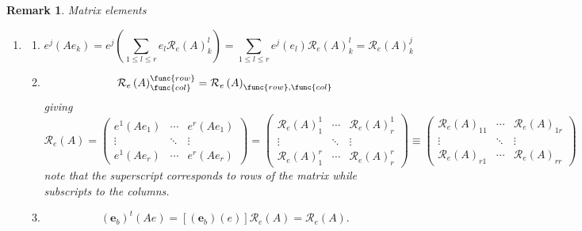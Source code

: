 \documentclass[aps,preprint]{revtex4}
\newtheorem{remark}[theorem]{Remark}
\begin{document}
\begin{remark}
Matrix elements

\begin{enumerate}
\item 
\begin{enumerate}
\item 
\begin{equation}
e^{j}\left( Ae_{k}\right) =e^{j}\left( \sum_{1\leq l\leq r}e_{l}\mathcal{R}%
_{e}\left( A\right) _{k}^{l}\right) =\sum_{1\leq l\leq r}e^{j}\left(
e_{l}\right) \mathcal{R}_{e}\left( A\right) _{k}^{l}=\mathcal{R}_{e}\left(
A\right) _{k}^{j}
\end{equation}

\item 
\begin{equation}
\mathcal{R}_{e}\left( A\right) _{\func{col}}^{\func{row}}=\mathcal{R}%
_{e}\left( A\right) _{\func{row},\func{col}}
\end{equation}%
giving%
\begin{equation}
\mathcal{R}_{e}\left( A\right) =\left( 
\begin{array}{ccc}
e^{1}\left( Ae_{1}\right) & \cdots & e^{r}\left( Ae_{1}\right) \\ 
\vdots & \ddots & \vdots \\ 
e^{1}\left( Ae_{r}\right) & \cdots & e^{r}\left( Ae_{r}\right)%
\end{array}%
\right) =\left( 
\begin{array}{ccc}
\mathcal{R}_{e}\left( A\right) _{1}^{1} & \cdots & \mathcal{R}_{e}\left(
A\right) _{r}^{1} \\ 
\vdots & \ddots & \vdots \\ 
\mathcal{R}_{e}\left( A\right) _{1}^{r} & \cdots & \mathcal{R}_{e}\left(
A\right) _{r}^{r}%
\end{array}%
\right) \equiv \left( 
\begin{array}{ccc}
\mathcal{R}_{e}\left( A\right) _{11} & \cdots & \mathcal{R}_{e}\left(
A\right) _{1r} \\ 
\vdots & \ddots & \vdots \\ 
\mathcal{R}_{e}\left( A\right) _{r1} & \cdots & \mathcal{R}_{e}\left(
A\right) _{rr}%
\end{array}%
\right)
\end{equation}%
note that the superscript corresponds to rows of the matrix while subscripts
to the columns.

\item 
\begin{equation}
\left( \boldsymbol{e}_{b}\right) ^{t}\left( Ae\right) =\left[ \left( 
\boldsymbol{e}_{b}\right) \left( e\right) \right] \mathcal{R}_{e}\left(
A\right) =\mathcal{R}_{e}\left( A\right) .
\end{equation}


\end{enumerate}
\end{enumerate}
\end{remark}
\end{document}
